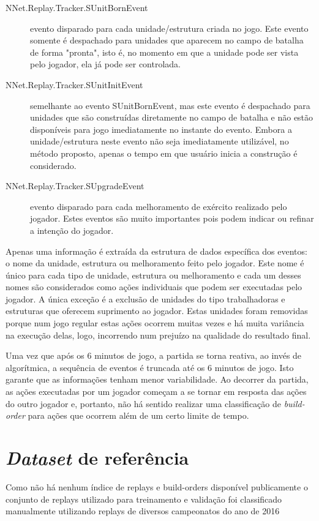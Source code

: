 \begin{description}
	\item[NNet.Replay.Tracker.SUnitBornEvent] evento disparado para cada \gls{unidade}/\gls{estrutura} criada no jogo. Este evento somente é despachado para \glspl{unidade} que aparecem no campo de batalha de forma "pronta", isto é, no momento em que a \gls{unidade} pode ser vista pelo jogador, ela já pode ser controlada.
	\item[NNet.Replay.Tracker.SUnitInitEvent] semelhante ao evento SUnitBornEvent, mas este evento é despachado para \glspl{unidade} que são construídas diretamente no campo de batalha e não estão disponíveis para jogo imediatamente no instante do evento. Embora a \gls{unidade}/\gls{estrutura} neste evento não seja imediatamente utilizável, no método proposto, apenas o tempo em que usuário inicia a construção é considerado.
	\item[NNet.Replay.Tracker.SUpgradeEvent] evento disparado para cada \gls{melhoramento} de exército realizado pelo jogador. Estes eventos são muito importantes pois podem indicar ou refinar a intenção do jogador.
\end{description}

Apenas uma informação é extraída da \gls{estrutura} de dados específica dos eventos: o nome da \gls{unidade}, \gls{estrutura} ou \gls{melhoramento} feito pelo jogador. Este nome é único para cada tipo de \gls{unidade}, \gls{estrutura} ou \gls{melhoramento} e cada um desses nomes são considerados como ações individuais que podem ser executadas pelo jogador. A única exceção é a exclusão de \glspl{unidade} do tipo trabalhadoras e \glspl{estrutura} que oferecem suprimento ao jogador. Estas \glspl{unidade} foram removidas porque num jogo regular estas ações ocorrem muitas vezes e há muita variância na execução delas, logo, incorrendo num prejuízo na qualidade do resultado final.

Uma vez que após os 6 minutos de jogo, a partida se torna reativa, ao invés de algorítmica, a sequência de eventos é truncada até os 6 minutos de jogo. Isto garante que as informações tenham menor variabilidade. Ao decorrer da partida, as ações executadas por um jogador começam a se tornar em resposta das ações do outro jogador e, portanto, não há sentido realizar uma classificação de \textit{\gls{build-order}} para ações que ocorrem além de um certo limite de tempo.

		\section{\textit{Dataset} de referência}
Como não há nenhum índice de \glspl{replay} e \glspl{build-order} disponível publicamente o conjunto de \glspl{replay} utilizado para treinamento e validação foi classificado manualmente utilizando \glspl{replay} de diversos campeonatos do ano de 2016

